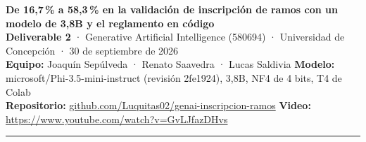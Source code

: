 \documentclass[9pt,a4paper]{extarticle}
\newcommand{\cod}[1]{{\ttfamily\small #1}}
\begin{document}
\raggedright

{\Large\bfseries De 16,7\,\% a 58,3\,\% en la validación de inscripción de ramos con un modelo de 3,8B y el reglamento en código}\\[0.8mm]
{\footnotesize\color{gris}%
\textbf{Deliverable 2} · Generative Artificial Intelligence (580694) · Universidad de Concepción · 30 de septiembre de 2026\\
\textbf{Equipo:} Joaquín Sepúlveda · Renato Saavedra · Lucas Saldivia \quad\textbullet\quad
\textbf{Modelo:} \cod{microsoft/Phi-3.5-mini-instruct} (revisión \cod{2fe1924}), 3,8B, NF4 de 4 bits, T4 de Colab\\
\textbf{Repositorio:} \href{https://github.com/Luquitas02/genai-inscripcion-ramos}{\cod{github.com/Luquitas02/genai-inscripcion-ramos}} \quad\textbullet\quad
\textbf{Video:} {\small\url{https://www.youtube.com/watch?v=GvLJfazDHvs}}}

\vspace{1.5mm}
{\color{linea}\rule{\textwidth}{0.4pt}}
\vspace{1mm}
\end{document}
